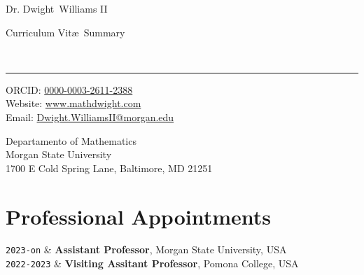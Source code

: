 \documentclass[10pt,a4paper]{article}
\makeatletter
\newcommand{\MSU}{Morgan State University}
\newcommand{\Pomona}{Pomona College}
\newcommand{\Title}{Curriculum Vit\ae\ Summary}
\newcommand{\FirstName}{Dwight}
\newcommand{\LastName}{Williams II}
\newcommand{\MyName}{Dr. \FirstName\ \MiddeName \LastName}
\newcommand{\Email}{Dwight.WilliamsII@morgan.edu}
\newcommand{\PersonalWebsite}{www.mathdwight.com}
\newcommand{\ORCID}{0000-0003-2611-2388}
\newcommand{\Duration}[2]{\fontsize{10pt}{0}\selectfont \texttt{#1-#2}}
\newcommand{\Ongoing}{on}
\newcommand{\Website}[1]{\href{https://#1}{#1}}
\makeatother
\begin{document}
\begin{minipage}[t]{0.5\textwidth}
  {\fontsize{20pt}{0}\selectfont\MyName}
\end{minipage}
\begin{minipage}[t]{0.5\textwidth}
  \begin{flushright}
    \Title{}
  \end{flushright}
\end{minipage}
\\[-0.1cm]
\textcolor{lightgray}{\rule{\textwidth}{3pt}}
\begin{minipage}[t]{0.5\textwidth}
  ORCID: \href{https://orcid.org/\ORCID}{\ORCID}
  \\
  Website: \Website{\PersonalWebsite}
  \\
  Email: \href{mailto:\Email}{\Email}
\end{minipage}
\begin{minipage}[t]{0.5\textwidth}
  \begin{flushright}
  Departamento of Mathematics
  \\
  Morgan State University
  \\
  1700 E Cold Spring Lane, Baltimore, MD 21251
  \end{flushright}
\end{minipage}
\vspace{0.3cm}

\section{Professional Appointments}

\begin{EntriesTableDuration}
  \Duration{2023}{\Ongoing}  &
  \textbf{Assistant Professor}, \MSU, USA
  \\
  \Duration{2022}{2023}  &
  \textbf{Visiting Assitant Professor}, \Pomona, USA
\end{EntriesTableDuration}

\end{document}
